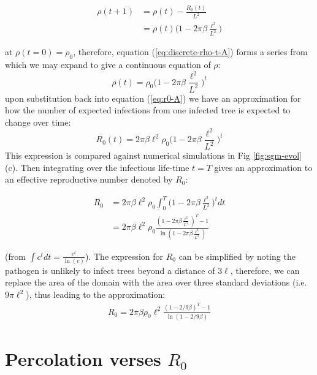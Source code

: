 \begin{equation}
\label{eq:discrete-rho-t-A}
\begin{split}
\rho(t+1) & = \rho(t) - \frac{R_0(t)}{L^2} \\
 & = \rho(t)\Big(1 - 2\pi\beta\frac{\ell^2}{L^2} \Big)
\end{split}
\end{equation}

at $\rho(t=0)=\rho_0$, therefore, equation (\ref{eq:discrete-rho-t-A}) forms a series from which we may expand to give a continuous equation of $\rho$:
\begin{equation}
    \rho(t) = \rho_0 \big(1 - 2\pi\beta\frac{\ell^2}{L^2}\big)^t
\end{equation}{}
upon substitution back into equation (\ref{eq:r0-A}) we have an approximation for how the number of expected infections from one infected tree is expected to change over time:
\begin{equation}
    R_0(t) = 2\pi\beta\ell^2\rho_0 \big(1 - 2\pi\beta\frac{\ell^2}{L^2} \big)^t
    \label{eq:Rt-A}
\end{equation}{}
This expression is compared against numerical simulations in Fig \ref{fig:sgm-evol}(c). Then integrating over the infectious life-time $t=T$ gives an approximation to an effective reproductive number denoted by $R_0$:

\begin{equation} \label{eq1}
\begin{split}
R_0 & = 2\pi\beta\ell^2\rho_0 \int ^T _0 \big(1 - 2\pi\beta\frac{\ell^2}{L^2} \big)^t dt \\
 & = 2\pi\beta\ell^2\rho_0 \frac{ (1 - 2\pi \beta\frac{\ell^2}{L^2})^T - 1}{\ln(1 - 2\pi\beta\frac{\ell^2}{L^2})}
\end{split}
\end{equation}

(from $\int c^t dt = \frac{c^t}{\ln(c)}$). The expression for $R_0$ can be simplified by noting the pathogen is unlikely to infect trees beyond a distance of $3\ell$, therefore, we can replace the area of the domain with the area over three standard deviations (i.e. $9\pi\ell^2$), thus leading to the approximation:
\begin{align*}
    R_0 = 2\pi\beta\rho_0\ell^2 \frac{(1 - 2/9\beta)^T - 1}{\ln(1-2/9\beta)}
\end{align*}

\chapter{Percolation verses $R_0$}

